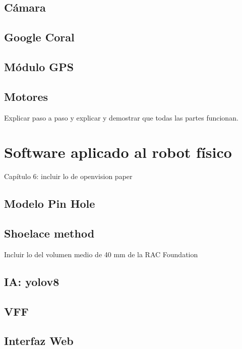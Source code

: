 \subsection{Cámara}

\subsection{Google Coral}

\subsection{Módulo GPS}

\subsection{Motores}


Explicar paso a paso y explicar y demostrar que todas las partes funcionan.


\section{Software aplicado al robot físico}

Capítulo 6: incluir lo de openvision paper\\

\subsection{Modelo Pin Hole}

\subsection{Shoelace method}

Incluir lo del volumen medio de 40 mm de la RAC Foundation

\subsection{IA: yolov8}

\subsection{VFF}

\subsection{Interfaz Web}

